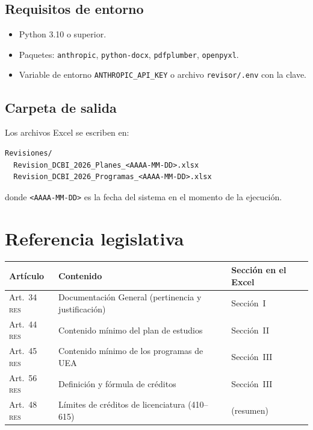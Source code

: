 \documentclass[11pt,a4paper]{article}
\newcommand{\RES}{\textsc{res}}
\begin{document}
\subsection{Requisitos de entorno}

\begin{itemize}[nosep]
  \item Python 3.10 o superior.
  \item Paquetes: \texttt{anthropic}, \texttt{python-docx}, \texttt{pdfplumber},
        \texttt{openpyxl}.
  \item Variable de entorno \texttt{ANTHROPIC\_API\_KEY} o archivo
        \texttt{revisor/.env} con la clave.
\end{itemize}

\subsection{Carpeta de salida}

Los archivos Excel se escriben en:

\begin{lstlisting}[language={}]
Revisiones/
  Revision_DCBI_2026_Planes_<AAAA-MM-DD>.xlsx
  Revision_DCBI_2026_Programas_<AAAA-MM-DD>.xlsx
\end{lstlisting}

donde \texttt{<AAAA-MM-DD>} es la fecha del sistema en el momento de la ejecución.

\section{Referencia legislativa}

\begin{center}
\begin{tabular}{lll}
\toprule
\textbf{Artículo} & \textbf{Contenido} & \textbf{Sección en el Excel} \\
\midrule
Art.\ 34 \RES{} & Documentación General (pertinencia y justificación) & Sección~I \\
Art.\ 44 \RES{} & Contenido mínimo del plan de estudios               & Sección~II \\
Art.\ 45 \RES{} & Contenido mínimo de los programas de UEA            & Sección~III \\
Art.\ 56 \RES{} & Definición y fórmula de créditos                    & Sección~III \\
Art.\ 48 \RES{} & Límites de créditos de licenciatura (410--615)      & (resumen) \\
\bottomrule
\end{tabular}
\end{center}

\end{document}
